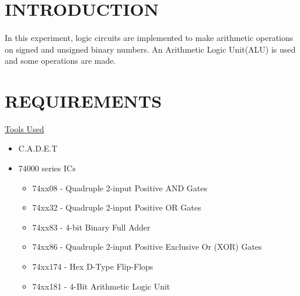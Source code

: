 \documentclass[pdftex,12pt,a4paper]{article}
\begin{document}
\setcounter{page}{1}

\section{INTRODUCTION}
\begin{flushleft}
\paragraph{}
In this experiment, logic circuits are implemented to make arithmetic operations on signed and unsigned binary numbers. An Arithmetic Logic Unit(ALU) is used and some operations are made.
\end{flushleft}

\section{REQUIREMENTS}
\begin{flushleft}
\underline{Tools Used}\cite{booklet}
\end{flushleft}
\begin{itemize}
    \item C.A.D.E.T
    \item 74000 series ICs
    \begin{itemize}
        \item 74xx08 - Quadruple 2-input Positive AND Gates
        \item 74xx32 - Quadruple 2-input Positive OR Gates   
        \item 74xx83 - 4-bit Binary Full Adder
        \item 74xx86 - Quadruple 2-input Positive Exclusive Or (XOR) Gates
        \item 74xx174 - Hex D-Type Flip-Flops
        \item 74xx181 - 4-Bit Arithmetic Logic Unit
    \end{itemize}
\end{itemize}
\end{document}
